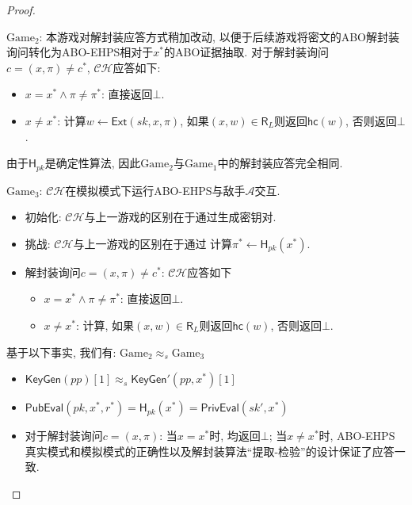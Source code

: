 \begin{proof}
\begin{trivlist}
\item $\text{Game}_2$: 本游戏对解封装应答方式稍加改动, 以便于后续游戏将密文的ABO解封装询问转化为ABO-EHPS相对于$x^*$的ABO证据抽取. 
	对于解封装询问$c = (x, \pi) \neq c^*$, $\mathcal{CH}$应答如下: 
    \begin{itemize} 
        \item $x = x^* \wedge \pi \neq \pi^*$: 直接返回$\bot$.
        \item $x \neq x^*$: 计算$w \leftarrow \mathsf{Ext}(sk, x, \pi)$, 
        	如果$(x, w) \in \mathsf{R}_L$则返回$\mathsf{hc}(w)$, 否则返回$\bot$.  
    \end{itemize}
	由于$\mathsf{H}_{pk}$是确定性算法, 因此$\text{Game}_2$与$\text{Game}_1$中的解封装应答完全相同. 


\item $\text{Game}_3$: $\mathcal{CH}$在模拟模式下运行ABO-EHPS与敌手$\mathcal{A}$交互. 
\begin{itemize}
    \item 初始化: $\mathcal{CH}$与上一游戏的区别在于通过生成密钥对.

    \item 挑战: $\mathcal{CH}$与上一游戏的区别在于通过 
    	计算$\pi^* \leftarrow \mathsf{H}_{pk}(x^*)$.

    \item 解封装询问$c = (x, \pi) \neq c^*$: $\mathcal{CH}$应答如下
    \begin{itemize} 
        \item $x = x^* \wedge \pi \neq \pi^*$: 直接返回$\bot$.
        \item $x \neq x^*$: 计算, 
        	如果$(x, w) \in \mathsf{R}_L$则返回$\mathsf{hc}(w)$, 否则返回$\bot$.
    \end{itemize}
\end{itemize}

\item 基于以下事实, 我们有: $\text{Game}_2 \approx_s \text{Game}_3$
\begin{itemize}
    \item $\mathsf{KeyGen}(pp)[1] \approx_s \mathsf{KeyGen}'(pp, x^*)[1]$
    
    \item $\mathsf{PubEval}(pk, x^*, r^*) = \mathsf{H}_{pk}(x^*) = \mathsf{PrivEval}(sk', x^*)$

    \item 对于解封装询问$c = (x, \pi)$: 当$x = x^*$时, 均返回$\bot$; 
    	当$x \neq x^*$时, ABO-EHPS真实模式和模拟模式的正确性以及解封装算法``提取-检验''的设计保证了应答一致. 
\end{itemize}
\end{trivlist}


\end{proof}

